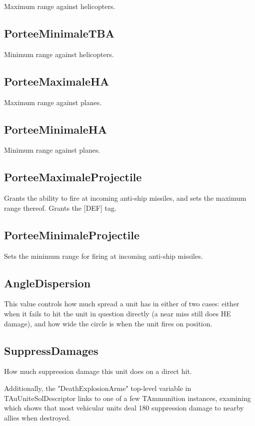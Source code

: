 \documentclass{article}
\begin{document}
Maximum range against helicopters.

\subsection{PorteeMinimaleTBA}

Minimum range against helicopters.

\subsection{PorteeMaximaleHA}

Maximum range against planes.

\subsection{PorteeMinimaleHA}

Minimum range against planes.

\subsection{PorteeMaximaleProjectile}

Grants the ability to fire at incoming anti-ship missiles, and sets the maximum range thereof. Grants the [DEF] tag.

\subsection{PorteeMinimaleProjectile}

Sets the minimum range for firing at incoming anti-ship missiles.

\subsection{AngleDispersion}

This value controls how much spread a unit has in either of two cases: either when it fails to hit the unit in question directly (a near miss still does HE damage), and how wide the circle is when the unit fires on position.

\subsection{SuppressDamages}

How much suppression damage this unit does on a direct hit.

Additionally, the "DeathExplosionArme" top-level variable in TAuUniteSolDescriptor links to one of a few TAmmunition instances, examining which shows that most vehicular units deal 180 suppression damage to nearby allies when destroyed.
\end{document}
